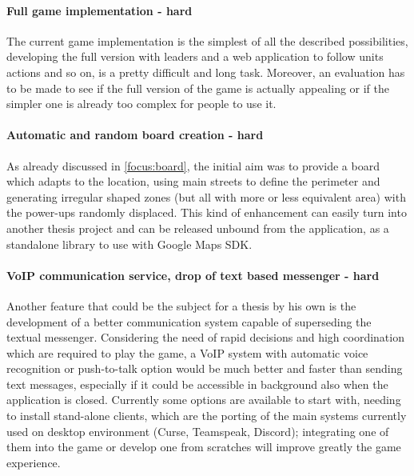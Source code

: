 	\paragraph{Full game implementation - hard}
		
		The current game implementation is the simplest of all the described possibilities, developing the full version with leaders and a web application to follow units actions and so on, is a pretty difficult and long task. Moreover, an evaluation has to be made to see if the full version of the game is actually appealing or if the simpler one is already too complex for people to use it.
	
	\paragraph{Automatic and random board creation - hard}
	
		As already discussed in \autoref{focus:board}, the initial aim was to provide a board which adapts to the location, using main streets to define the perimeter and generating irregular shaped zones (but all with more or less equivalent area) with the power-ups randomly displaced. This kind of enhancement can easily turn into another thesis project and can be released unbound from the application, as a standalone library to use with Google Maps SDK.
	
	\paragraph{VoIP communication service, drop of text based messenger - hard}
	
		Another feature that could be the subject for a thesis by his own is the development of a better communication system capable of superseding the textual messenger. Considering the need of rapid decisions and high coordination which are required to play the game, a VoIP system with automatic voice recognition or push-to-talk option would be much better and faster than sending text messages, especially if it could be accessible in background also when the application is closed. Currently some options are available to start with, needing to install stand-alone clients, which are the porting of the main systems currently used on desktop environment (Curse, Teamspeak, Discord); integrating one of them into the game or develop one from scratches will improve greatly the game experience.